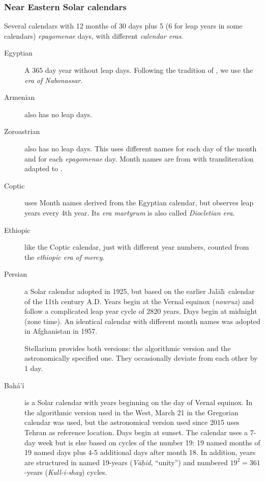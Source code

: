 \subsubsection{Near Eastern Solar calendars}
Several calendars with 12 months of 30 days plus 5 (6 for leap years
in some calendars) \emph{epagomenae} days, with different \emph{calendar eras}.
\begin{description}
\item[Egyptian] A 365 day year without leap days. Following the
  tradition of , we use the \emph{era of Nabonassar}.
\item[Armenian] also has no leap days.
\item[Zoroastrian] also has no leap days. This uses different names
  for each day of the month and for each \emph{epagomenae} day. Month
  names are from \citet[\S69]{Ginzel:ChronologieI} with
  transliteration adapted to \citet{Reingold-Dershowitz:2018}.
\item[Coptic] uses Month names derived from the Egyptian calendar, but observes
  leap years every 4th year. Its \emph{era martyrum} is also called
  \emph{Diocletian era}.
\item[Ethiopic] like the Coptic calendar, just with different
  year numbers, counted from the \emph{ethiopic era of mercy}.
\item[Persian] a Solar calendar adopted in 1925,
  but based on the earlier Jal\=al\=\i\ calendar of the 11th century
  A.D. Years begin at the Vernal equinox (\emph{nowruz}) and follow a
  complicated leap year cycle of 2820 years. Days begin at midnight
  (zone time). An identical calendar with different month names was
  adopted in Afghanistan in 1957.

  Stellarium provides both versions: the algorithmic version and the
  astronomically specified one. They occasionally deviate from each
  other by 1 day.
\item[Bahá’í] is a Solar calendar with years beginning on the day of
  Vernal equinox.  In the algorithmic version used in
  the West, March 21 in the Gregorian calendar was used, but the
  astronomical version used since 2015 uses Tehran as reference
  location.  Days begin at sunset. The calendar uses a 7-day week but
  is else based on cycles of the number 19: 19 named months of 19
  named days plus 4-5 additional days after month 18. In addition,
  years are structured in named 19-years (\emph{Vā\d{h}id}, ``unity'') and
  numbered $19^2=361$-years (\emph{Kull-i-shay}) cycles.
\end{description}

